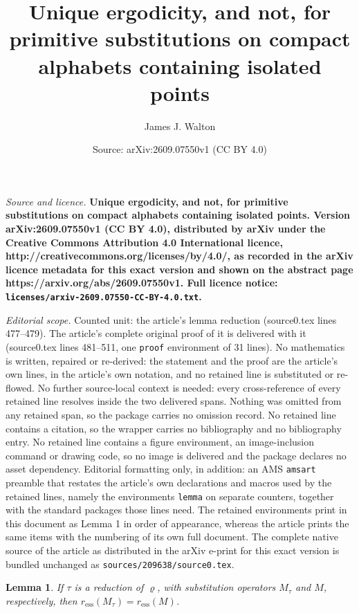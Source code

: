 \documentclass[10pt,a4paper]{amsart}
\title{\bf Unique ergodicity, and not, for primitive substitutions on compact alphabets containing isolated points}
\author{James J. Walton}
\date{Source: arXiv:2609.07550v1 (CC BY 4.0)}
\newtheorem{lemma}{Lemma}
\newcommand{\sub}{\varrho}
\begin{document}
\maketitle

\noindent\emph{Source and licence.} \bf Unique ergodicity, and not, for primitive substitutions on compact alphabets containing isolated points. Version arXiv:2609.07550v1 (CC BY 4.0), distributed by arXiv under the Creative Commons Attribution 4.0 International licence, http://creativecommons.org/licenses/by/4.0/, as recorded in the arXiv licence metadata for this exact version and shown on the abstract page https://arxiv.org/abs/2609.07550v1. Full licence notice: \texttt{licenses/arxiv-2609.07550-CC-BY-4.0.txt}.\par\smallskip

\noindent\textit{Editorial scope.} Counted unit: the article's lemma reduction (source0.tex lines 477--479). The article's complete original proof of it is delivered with it (source0.tex lines 481--511, one \texttt{proof} environment of 31 lines). No mathematics is written, repaired or re-derived: the statement and the proof are the article's own lines, in the article's own notation, and no retained line is substituted or re-flowed.  No further source-local context is needed: every cross-reference of every retained line resolves inside the two delivered spans.  Nothing was omitted from any retained span, so the package carries no omission record.  No retained line contains a citation, so the wrapper carries no bibliography and no bibliography entry.  No retained line contains a figure environment, an image-inclusion command or drawing code, so no image is delivered and the package declares no asset dependency.  Editorial formatting only, in addition: an AMS \texttt{amsart} preamble that restates the article's own declarations and macros used by the retained lines, namely the environments \texttt{lemma} on separate counters, together with the standard packages those lines need.  The retained environments print in this document as Lemma 1 in order of appearance, whereas the article prints the same items with the numbering of its own full document.  The complete native source of the article as distributed in the arXiv e-print for this exact version is bundled unchanged as \texttt{sources/209638/source0.tex}.
\begin{lemma}\label{lem:essential spectral radius unaffected by reduction}
If \(\tau\) is a reduction of \(\sub\), with substitution operators \(M_\tau\) and \(M\), respectively, then \(r_\mathrm{ess}(M_\tau) = r_\mathrm{ess}(M)\).
\end{lemma}
\end{document}
